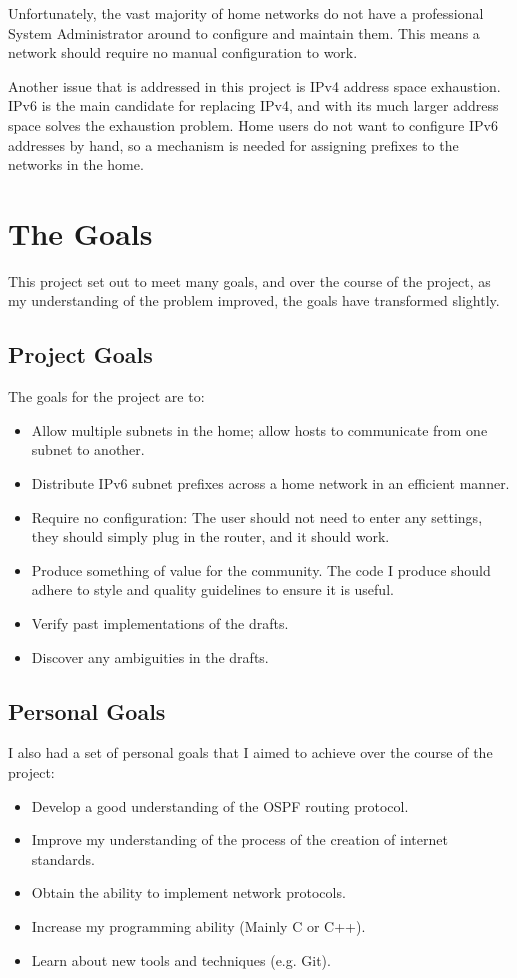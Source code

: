 \documentclass[12pt,a4paper,twoside]{report}
\begin{document}
Unfortunately, the vast majority of home networks do not have a professional
System Administrator around to configure and maintain them. This means a
network should require no manual configuration to work.

Another issue that is addressed in this project is IPv4
 address space exhaustion. IPv6
is the main candidate for replacing IPv4, and with its much larger address
space solves the exhaustion problem. Home users do not want to configure IPv6
addresses by hand, so a mechanism is needed for assigning prefixes to the
networks in the home. 

\section{The Goals}
This project set out to meet many goals, and over the course of the project, as my
understanding of the problem improved, the goals have transformed slightly.

\subsection{Project Goals}
The goals for the project are to:

\begin{itemize}
\item Allow multiple subnets in the home; allow hosts to communicate from one
  subnet to another.
\item Distribute IPv6 subnet prefixes across a home network in an efficient
	manner. 
\item Require no configuration: The user should not need to enter any settings,
  they should simply plug in the router, and it should work.
\item Produce something of value for the community. The code I produce should
  adhere to style and quality guidelines to ensure it is useful.
\item Verify past implementations of the drafts.
\item Discover any ambiguities in the drafts.
\end{itemize}

\subsection{Personal Goals}
I also had a set of personal goals that I aimed to achieve over the course of
the project:
\begin{itemize}
	\item Develop a good understanding of the OSPF routing protocol.
	\item Improve my understanding of the process of the creation of internet
		standards.
	\item Obtain the ability to implement network protocols.
	\item Increase my programming ability (Mainly C or C++).
	\item Learn about new tools and techniques (e.g. Git).
\end{itemize}
\end{document}
